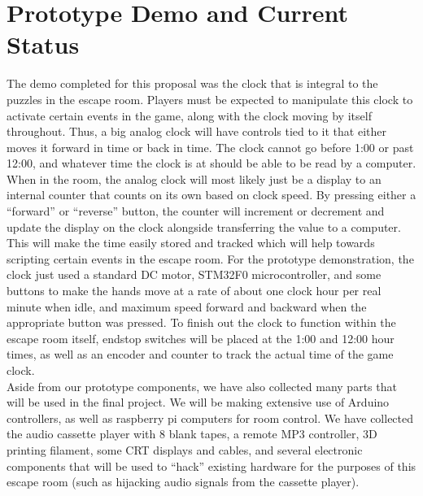 \documentclass[conference]{IEEEtran}
\begin{document}
\section{Prototype Demo and Current Status}
The demo completed for this proposal was the clock that is integral to
the puzzles in the escape room. Players must be expected to manipulate
this clock to activate certain events in the game, along with the clock
moving by itself throughout. Thus, a big analog clock will have controls
tied to it that either moves it forward in time or back in time. The
clock cannot go before 1:00 or past 12:00, and whatever time the clock
is at should be able to be read by a computer.
\\
\indent When in the room, the analog clock will most likely just be a display to an internal
counter that counts on its own based on clock speed. By pressing either a
``forward'' or ``reverse'' button, the counter will increment or decrement
and update the display on the clock alongside transferring the value to
a computer. This will make the time easily stored and tracked which will
help towards scripting certain events in the escape room. For the prototype demonstration,
the clock just used a standard DC motor, STM32F0 microcontroller, and some buttons
to make the hands move at a rate of about one clock hour per real minute when idle, and
maximum speed forward and backward when the appropriate button was pressed. To finish out
the clock to function within the escape room itself, endstop switches will be placed at 
the 1:00 and 12:00 hour times, as well as an encoder and counter to track the actual time
of the game clock.
\\
\indent Aside from our prototype components, we have also collected many
parts that will be used in the final project. We will be making extensive
use of Arduino controllers, as well as raspberry pi computers for room control.
We have collected the audio cassette player with 8 blank tapes, a remote MP3
controller, 3D printing filament, some CRT displays and cables, and several
electronic components that will be used to ``hack'' existing hardware for the
purposes of this escape room (such as hijacking audio signals from the cassette
player).

\end{document}
